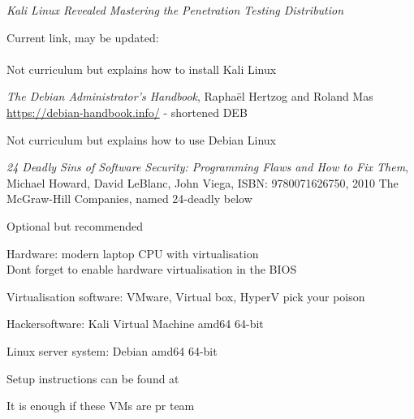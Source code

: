 \documentclass[Screen16to9,17pt]{foils}
\begin{document}

\emph{Kali Linux Revealed  Mastering the Penetration Testing Distribution}

Current link, may be updated:\\
\\
Not curriculum but explains how to install Kali Linux




\emph{The Debian Administrator’s Handbook}, Raphaël Hertzog and Roland Mas\\
\url{https://debian-handbook.info/} - shortened DEB

Not curriculum but explains how to use Debian Linux



\emph{24 Deadly Sins of Software Security: Programming Flaws and How to Fix Them}, Michael Howard, David LeBlanc, John Viega, ISBN: 9780071626750, 2010 The McGraw-Hill Companies, named 24-deadly below

Optional but recommended







\begin{list2}
\item Hardware: modern laptop CPU with virtualisation\\
Dont forget to enable hardware virtualisation in the BIOS
\item Virtualisation software: VMware, Virtual box, HyperV pick your poison
\item Hackersoftware: Kali Virtual Machine amd64 64-bit 
\item Linux server system: Debian amd64 64-bit 
\item Setup instructions can be found at 
\end{list2}

\centerline{It is enough if these VMs are pr team}


\end{document}
